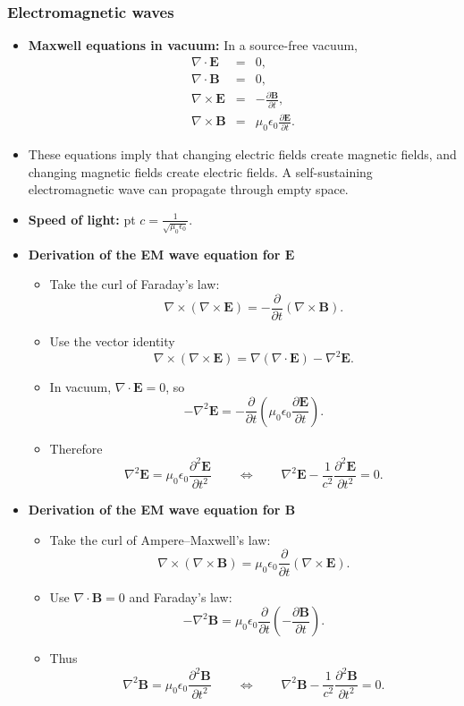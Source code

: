 \documentclass[t,aspectratio=169]{beamer}
\newcommand{\E}{\mathbf{E}}
\newcommand{\B}{\mathbf{B}}
\begin{document}
\begin{frame}
\frametitle{Electromagnetic waves}
\begin{itemize}
\setlength{\parskip}{0pt}
\setlength{\itemsep}{4pt}
\item \textbf{Maxwell equations in vacuum:} In a source-free vacuum,
\begin{eqnarray*}
\nabla\cdot\E&=&0,\\
\nabla\cdot\B&=&0,\\
\nabla\times\E&=&-\frac{\partial \B}{\partial t},\\
\nabla\times\B&=&\mu_0\epsilon_0\frac{\partial \E}{\partial t}.
\end{eqnarray*}
\item These equations imply that changing electric fields create magnetic fields, and changing magnetic fields create electric fields. A self-sustaining electromagnetic wave can propagate through empty space.

\item \textbf{Speed of light:}  pt $c=\frac{1}{\sqrt{\mu_0\epsilon_0}}.$

\pagebreak
\item \textbf{Derivation of the EM wave equation for $\mathbf{E}$}
\begin{itemize}
\item Take the curl of Faraday's law:
  $$\nabla\times(\nabla\times\E)=-\frac{\partial}{\partial t}(\nabla\times\B).$$
\item Use the vector identity
$$\nabla\times(\nabla\times\E)=\nabla(\nabla\cdot\E)-\nabla^2\E.$$
\item In vacuum, $\nabla\cdot\E=0$, so
  $$ -\nabla^2\E=-\frac{\partial}{\partial t}\left(\mu_0\epsilon_0\frac{\partial \E}{\partial t}\right).$$

\pagebreak
\item Therefore
$$\boxed{\nabla^2\E=\mu_0\epsilon_0\frac{\partial^2\E}{\partial t^2}}
\qquad \Longleftrightarrow \qquad
\boxed{\nabla^2\E-\frac{1}{c^2}\frac{\partial^2\E}{\partial t^2}=0.}$$
\end{itemize}

\pagebreak
\item \textbf{Derivation of the EM wave equation for $\mathbf{B}$}
\begin{itemize}
\item Take the curl of Ampere--Maxwell's law:
$$\nabla\times(\nabla\times\B)=\mu_0\epsilon_0\frac{\partial}{\partial t}(\nabla\times\E).$$
\item Use $\nabla\cdot\B=0$ and Faraday's law:
  $$ -\nabla^2\B=\mu_0\epsilon_0\frac{\partial}{\partial t}\left(-\frac{\partial\B}{\partial t}\right).$$
\item Thus
$$\boxed{\nabla^2\B=\mu_0\epsilon_0\frac{\partial^2\B}{\partial t^2}}
\qquad \Longleftrightarrow \qquad
\boxed{\nabla^2\B-\frac{1}{c^2}\frac{\partial^2\B}{\partial t^2}=0.}$$


\end{itemize}
\end{itemize}
\end{frame}
\end{document}

